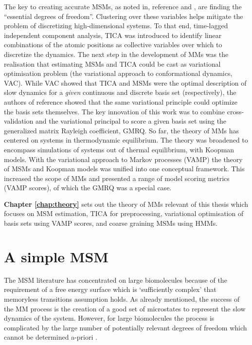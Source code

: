 The key to creating accurate MSMs, as noted in, reference  \cite{zwanzigClassicalDynamicsContinuous1983a} and \cite{schutteDirectApproachConformational1999}, are finding the ``essential degrees of freedom''. Clustering over these variables helps mitigate the problem of discretizing high-dimensional systems. To that end, time-lagged independent component analysis, TICA\cite{perez-hernandezIdentificationSlowMolecular2013a, schwantesImprovementsMarkovState2013} was introduced to identify linear combinations of the atomic positions as collective variables over which to discretize the dynamics. 
The next step in the development of MMs was the realisation that estimating MSMs and TICA could be cast as variational optimisation problem (the variational approach to conformational dynamics, VAC\cite{nuskeVariationalApproachMolecular2014}). While VAC showed that TICA and MSMs were the optimal description of slow dynamics for a \emph{given} continuous and discrete basis set (respectively), the authors of reference \cite{mcgibbonVariationalCrossvalidationSlow2015} showed that the same variational principle could optimize the basis sets themselves. The key innovation of this work was to combine cross-validation\cite{arlotSurveyCrossvalidationProcedures2009} and the variational principal to score a given basis set using the generalized matrix Rayleigh coefficient, GMRQ. So far, the theory of MMs has centered on systems in thermodynamic equilibrium. The theory was broadened to encompass simulations of systems out of thermal equilibrium, with Koopman models\cite{wuVariationalKoopmanModels2017}. With the variational approach to Markov processes (VAMP) the theory of MSMs and Koopman models was unified into one conceptual framework. This increased the scope of MMs and presented a range of model scoring metrics (VAMP scores), of which the GMRQ was a special case.

\textbf{Chapter \ref{chap:theory}} sets out the theory of MMs relevant of this thesis which focuses on MSM estimation, TICA for preprocessing, variational optimisation of basis sets using VAMP scores, and coarse graining MSMs using HMMs. 

\section{A simple MSM}
The MSM literature has concentrated on large biomolecules because of the requirement of a free energy surface which is `sufficiently complex' that memoryless transitions assumption holds. As already mentioned, the success of the MM process is the creation of a good set of microstates to represent the slow dynamics of the system. However, for large biomolecules the process is complicated by the large number of potentially relevant degrees of freedom which cannot be determined a-priori \cite{shallowayMacrostatesClassicalStochastic1996}. 

